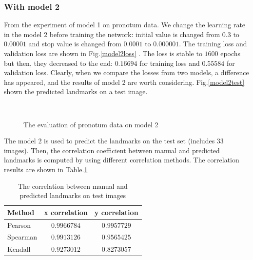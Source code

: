 \documentclass[12pt,a4paper]{article}
\begin{document}
\subsubsection{With model 2}
From the experiment of model 1 on pronotum data. We change the learning rate in the model 2 before training the network: initial value is changed from $0.3$ to $0.00001$ and stop value is changed from $0.0001$ to $0.000001$. The training loss and validation loss are shown in Fig.\ref{model2loss} . The loss is stable to $1600$ epochs but then, they decreased to the end: $0.16694$ for training loss and $0.55584$ for validation loss. Clearly, when we compare the losses from two models, a difference has appeared, and the results of model 2 are worth considering. Fig.\ref{model2test} shown the predicted landmarks on a test image.
\begin{figure}[h!]
\centering
{}~~
\caption{The evaluation of pronotum data on model 2}
\label{model2tl}
\end{figure}
The model 2 is used to predict the landmarks on the test set (includes 33 images). Then, the correlation coefficient between manual and predicted landmarks is computed by using different correlation methods\cite{pallant2013spss,myers2010research,kendall1938new}. The correlation results are shown in Table.\ref{corr1}
\begin{table}[h!]
	\centering
	\begin{tabular}{l c c}
		Method & x correlation & y correlation \\ \hline
		Pearson & $0.9966784$ & $0.9957729$ \\ \hline
		Spearman & $0.9913126$ & $0.9565425$ \\ \hline
		Kendall & $0.9273012$ & $0.8273057$ \\ \hline
	\end{tabular}
	\caption{The correlation between manual and predicted landmarks on test images}
	\label{corr1}
\end{table}
\end{document}
